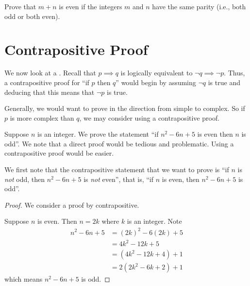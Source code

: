 \begin{exercise}
    Prove that $m + n$ is even if the integers $m$ and $n$ have the same parity (i.e., both odd or both even).
\end{exercise}

\section{Contrapositive Proof}
We now look at a . Recall that $p \implies q$ is logically equivalent to $\lnot q \implies \lnot p$. Thus, a contrapositive proof for ``if $p$ then $q$'' would begin by assuming $\lnot q$ is true and deducing that this means that $\lnot p$ is true.

Generally, we would want to prove in the direction from simple to complex. So if $p$ is more complex than $q$, we may consider using a contrapositive proof.

\begin{example}\label{example-if-(n-1)(n-5)-is-even-then-n-is-odd}
    Suppose $n$ is an integer. We prove the statement ``if $n^2 - 6n + 5$ is even then $n$ is odd''. We note that a direct proof would be tedious and problematic. Using a contrapositive proof would be easier.

    We first note that the contrapositive statement that we want to prove is ``if $n$ is \textit{not} odd, then $n^2 - 6n + 5$ is \textit{not} even'', that is, ``if $n$ is even, then $n^2 - 6n + 5$ is odd''.

    \begin{proof}
        We consider a proof by contrapositive.

        Suppose $n$ is even. Then $n = 2k$ where $k$ is an integer. Note
        \begin{align*}
            n^2 - 6n + 5 &= (2k)^2 - 6(2k) + 5\\
            &= 4k^2 - 12k + 5\\
            &= (4k^2 - 12k + 4) + 1\\
            &= 2(2k^2 - 6k + 2) + 1
        \end{align*}
        which means $n^2 - 6n + 5$ is odd.
    \end{proof}
\end{example}

